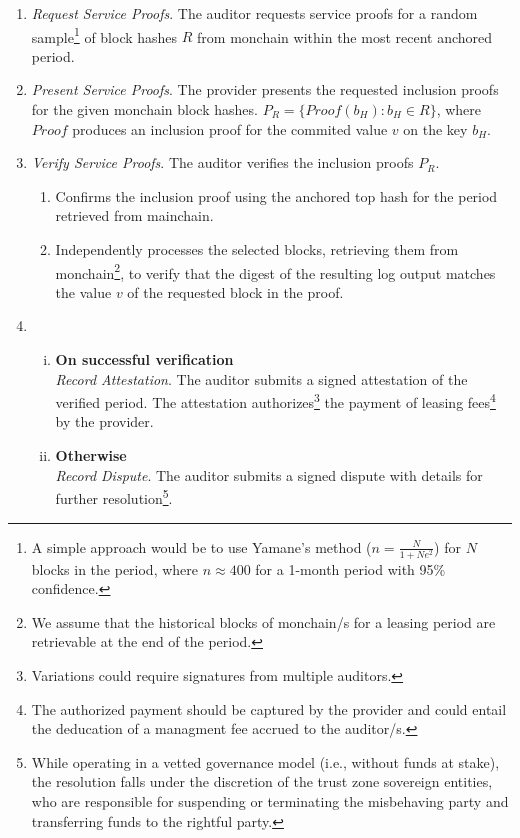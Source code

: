 \documentclass{oc}
\begin{document}
\begin{enumerate}
  \item \emph{Request Service Proofs}. The \gls{auditor} requests service proofs for a random sample\footnote{
    A simple approach would be to use Yamane's method ($n=\frac{N}{1+Ne^2}$) for $N$ blocks in the period, where $n\approx400$ for a 1-month period with 95\% confidence.
  } of block hashes $R$ from \gls{monchain} within the most recent anchored period.
  
  \item \emph{Present Service Proofs}. The \gls{provider} presents the requested inclusion proofs for the given \gls{monchain} block hashes. $P_{R}=\{Proof(b_H) : b_H \in R\}$,
  where $Proof$ produces an inclusion proof for the commited value $v$ on the key $b_H$.
  
  \item \emph{Verify Service Proofs}. The \gls{auditor} verifies the inclusion proofs $P_{R}$.
    \begin{enumerate}
      \item Confirms the inclusion proof using the anchored top hash for the period retrieved from \gls{mainchain}.
      \item Independently processes the selected blocks, retrieving them from \gls{monchain}\footnote{
        We assume that the historical blocks of \gls*{monchain}/s for a leasing period are retrievable at the end of the period.
      }, to verify that the digest of the resulting log output matches the value $v$ of the requested block in the proof.
    \end{enumerate}
  \item
    \begin{enumerate}[(i)]
      \item \textbf{On successful verification} \\
      \emph{Record Attestation}. The \gls{auditor} submits a signed attestation of the verified period. The attestation authorizes\footnote{
        Variations could require signatures from multiple auditors.
      } the payment of leasing fees\footnote{
        The authorized payment should be captured by the \gls{provider} and could entail the deducation of a managment fee accrued to the \gls{auditor}/s.
      } by the \gls{provider}.
      \item \textbf{Otherwise} \\
      \emph{Record Dispute}. The \gls{auditor} submits a signed dispute with details for further resolution\footnote{
        While operating in a vetted governance model (i.e., without funds at stake),
        the resolution falls under the discretion of the trust zone sovereign entities,
        who are responsible for suspending or terminating the misbehaving party and transferring funds to the rightful party.
      }.
    \end{enumerate}

\end{enumerate}
\end{document}
